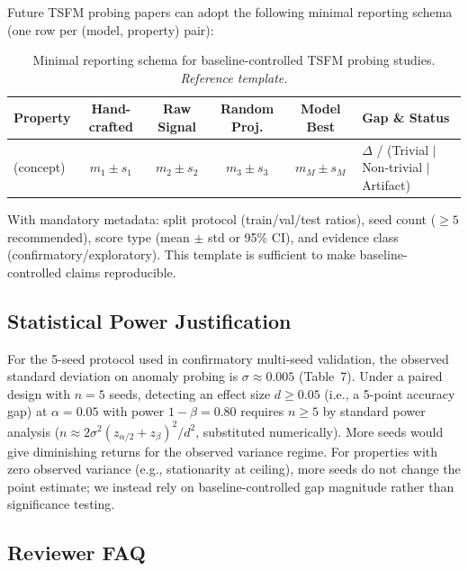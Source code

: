 \documentclass{article}
\begin{document}
Future TSFM probing papers can adopt the following minimal reporting schema (one row per (model, property) pair):

\begin{table}[H]
\centering
\footnotesize
\setlength{\tabcolsep}{4pt}
\caption{Minimal reporting schema for baseline-controlled TSFM probing studies. \emph{Reference template.}}
\label{tab:minimal_reporting}
\begin{tabular}{@{}>{\raggedright\arraybackslash}p{2.0cm}cccc>{\raggedright\arraybackslash}p{4.5cm}@{}}
\toprule
Property & Hand-crafted & Raw Signal & Random Proj. & Model Best & Gap \& Status \\
\midrule
(concept) & $m_1 \pm s_1$ & $m_2 \pm s_2$ & $m_3 \pm s_3$ & $m_M \pm s_M$ & $\Delta$ / (Trivial $|$ Non-trivial $|$ Artifact) \\
\bottomrule
\end{tabular}
\end{table}

\noindent With mandatory metadata: split protocol (train/val/test ratios), seed count ($\geq 5$ recommended), score type (mean $\pm$ std or 95\% CI), and evidence class (confirmatory/exploratory). This template is sufficient to make baseline-controlled claims reproducible.

\subsection{Statistical Power Justification}
\label{sec:power}

For the 5-seed protocol used in confirmatory multi-seed validation, the observed standard deviation on anomaly probing is $\sigma \approx 0.005$ (Table~7). Under a paired design with $n=5$ seeds, detecting an effect size $d \geq 0.05$ (i.e., a 5-point accuracy gap) at $\alpha = 0.05$ with power $1-\beta = 0.80$ requires $n \geq 5$ by standard power analysis ($n \approx 2 \sigma^2 (z_{\alpha/2} + z_\beta)^2 / d^2$, substituted numerically). More seeds would give diminishing returns for the observed variance regime. For properties with zero observed variance (e.g., stationarity at ceiling), more seeds do not change the point estimate; we instead rely on baseline-controlled gap magnitude rather than significance testing.

\subsection{Reviewer FAQ}
\label{sec:faq}
\end{document}
